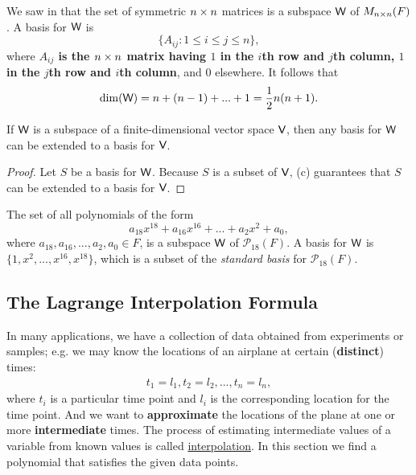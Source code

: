 \begin{example} \label{example 1.6.20}
We saw in  that the set of symmetric \(n \times n\) matrices is a subspace \(\textsf{W}\) of \(M_{n \times n}(F)\).
A basis for \(\textsf{W}\) is
\[
    \{ A_{ij} : 1 \le i \le j \le n \},
\]
where \textbf{\(A_{ij}\) is the \(n \times n\) matrix having \(1\) in the \(i\)th row and \(j\)th column, \(1\) in the \(j\)th row and \(i\)th column}, and \(0\) elsewhere.
It follows that
\[
    \dim(\textsf{W}) = n + (n - 1) + ... + 1 = \frac{1}{2}n(n + 1). 
\]
\end{example}

\begin{corollary} \label{corollary 1.11.1}
If \(\textsf{W}\) is a subspace of a finite-dimensional vector space \(\textsf{V}\), then any basis for \(\textsf{W}\) can be extended to a basis for \(\textsf{V}\).
\end{corollary}

\begin{proof}
Let \(S\) be a basis for \(\textsf{W}\).
Because \(S\) is a \LID{} subset of \(\textsf{V}\), (c) guarantees that \(S\) can be extended to a basis for \(\textsf{V}\).
\end{proof}

\begin{example} \label{example 1.6.21}
The set of all polynomials of the form
\[
    a_{18} x^{18} + a_{16} x^{16} + ... + a_2 x^2 + a_0,
\]
where \(a_{18}, a_{16}, ..., a_2, a_0 \in F\), is a subspace \(\textsf{W}\) of \(\mathcal{P}_{18}(F)\).
A basis for \(\textsf{W}\) is \(\{ 1, x^2, ..., x^{16}, x^{18} \}\), which is a subset of the \emph{standard basis} for \(\mathcal{P}_{18}(F)\).
\end{example}

\subsection{The Lagrange Interpolation Formula}
In many applications, we have a collection of data obtained from experiments or samples;
e.g. we may know the locations of an airplane at certain (\textbf{distinct}) times:
\begin{align*}
    t_1 = l_1,
    t_2 = l_2,
    ...,
    t_n = l_n,
\end{align*}
where \(t_i\) is a particular time point and \(l_i\) is the corresponding location for the time point.
And we want to \textbf{approximate} the locations of the plane at one or more \textbf{intermediate} times.
The process of estimating intermediate values of a variable from known values is called \href{https://www.wikiwand.com/en/Interpolation}{interpolation}.
In this section we find a polynomial that satisfies the given data points.

